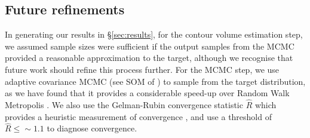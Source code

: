\subsection{Future refinements}
In generating our results in \S\ref{sec:results}, for the contour volume estimation step, we assumed sample sizes were sufficient if the output samples from the MCMC provided a reasonable approximation to the target, although we recognise that future work should refine this process further. For the MCMC step, we use adaptive covariance MCMC (see SOM of \cite{johnstone2016uncertainty}) to sample from the target distribution, as we have found that it provides a considerable speed-up over Random Walk Metropolis \cite{metropolis1953equation,lambert2018Student}. We also use the Gelman-Rubin convergence statistic $\hat{R}$ which provides a heuristic measurement of convergence \cite{lambert2018Student,gelman1992inference}, and use a threshold of $\hat{R}\leq\sim 1.1$ to diagnose convergence.
